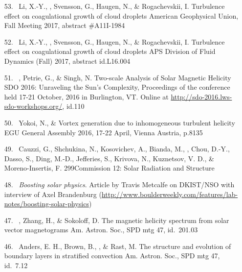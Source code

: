\begin{itemize}
\item[{53.}~]
Li, X.-Y., \Brandenburg, Svensson, G., Haugen, N., \& Rogachevskii, I.
{Turbulence effect on coagulational growth of cloud droplets}
{American Geophysical Union, Fall Meeting 2017, abstract \#A11I-1984}

\item[{52.}~]
Li, X.-Y., \Brandenburg, Svensson, G., Haugen, N., \& Rogachevskii, I.
{Turbulence effect on coagulational growth of cloud droplets}
{APS Division of Fluid Dynamics (Fall) 2017, abstract id.L16.004}

\item[{51.}~]
\Brandenburg, Petrie, G., \& Singh, N.
{Two-scale Analysis of Solar Magnetic Helicity}
{SDO 2016: Unraveling the Sun's Complexity, Proceedings of the
conference held 17-21 October, 2016 in Burlington, VT. Online at
\url{http://sdo-2016.lws-sdo-workshops.org/}, id.110}

\item[{50.}~]
Yokoi, N., \& \Brandenburg{}
{Vortex generation due to inhomogeneous turbulent helicity}
{EGU General Assembly 2016, 17-22 April, Vienna Austria, p.8135}

\item[{49.}~]
Cauzzi, G., Shchukina, N., Kosovichev, A., Bianda, M., \Brandenburg, Chou, D.-Y., Dasso, S., Ding, M.-D., Jefferies, S., Krivova, N., Kuznetsov, V. D., \& Moreno-Insertis, F.
{299}{Commission 12: Solar Radiation and Structure}

\item[{48.}~]
{\it Boosting solar physics}. Article by Travis Metcalfe on
DKIST/NSO with interview of Axel Brandenburg
(\url{http://www.boulderweekly.com/features/lab-notes/boosting-solar-physics})

\item[{47.}~]
\Brandenburg, Zhang, H., \& Sokoloff, D.
{The magnetic helicity spectrum from solar vector magnetograms}
{Am. Astron. Soc., SPD mtg 47, id.\ 201.03}

\item[{46.}~]
Anders, E. H., Brown, B., \Brandenburg, \& Rast, M.
{The structure and evolution of boundary layers in stratified convection}
{Am. Astron. Soc., SPD mtg 47, id.\ 7.12}


\end{itemize}
